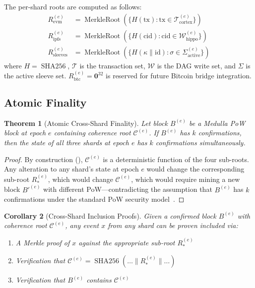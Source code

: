 \documentclass[11pt,twocolumn]{article}
\theoremstyle{definition}
\theoremstyle{plain}
\newtheorem{theorem}{Theorem}[section]
\newtheorem{corollary}[theorem]{Corollary}
\theoremstyle{remark}
\DeclareMathOperator{\merkleroot}{MerkleRoot}
\DeclareMathOperator{\shatwofiftysix}{SHA256}
\begin{document}
The per-shard roots are computed as follows:
\begin{align}
  R_{\mathrm{evm}}^{(e)} &= \merkleroot\!\left(\{H(\mathrm{tx}) : \mathrm{tx} \in \mathcal{T}_{\mathrm{cortex}}^{(e)}\}\right) \label{eq:evm-root}\\
  R_{\mathrm{ipfs}}^{(e)} &= \merkleroot\!\left(\{H(\mathrm{cid}) : \mathrm{cid} \in \mathcal{W}_{\mathrm{hippo}}^{(e)}\}\right) \label{eq:ipfs-root}\\
  R_{\mathrm{sleeves}}^{(e)} &= \merkleroot\!\left(\{H(\kappa \| \mathrm{id}) : \sigma \in \Sigma_{\mathrm{active}}^{(e)}\}\right) \label{eq:sleeve-root}
\end{align}
where $H = \shatwofiftysix$, $\mathcal{T}$ is the transaction set, $\mathcal{W}$ is the DAG write set, and $\Sigma$ is the active sleeve set. $R_{\mathrm{btc}}^{(e)} = \mathbf{0}^{32}$ is reserved for future Bitcoin bridge integration.

\subsection{Atomic Finality}

\begin{theorem}[Atomic Cross-Shard Finality]\label{thm:atomic-finality}
Let block $B^{(e)}$ be a Medulla PoW block at epoch $e$ containing coherence root $\mathcal{C}^{(e)}$. If $B^{(e)}$ has $k$ confirmations, then the state of all three shards at epoch $e$ has $k$ confirmations simultaneously.
\end{theorem}

\begin{proof}
By construction (), $\mathcal{C}^{(e)}$ is a deterministic function of the four sub-roots. Any alteration to any shard's state at epoch $e$ would change the corresponding sub-root $R_*^{(e)}$, which would change $\mathcal{C}^{(e)}$, which would require mining a new block $B'^{(e)}$ with different PoW---contradicting the assumption that $B^{(e)}$ has $k$ confirmations under the standard PoW security model~\cite{nakamoto2008bitcoin,garay2015backbone}.
\end{proof}

\begin{corollary}[Cross-Shard Inclusion Proofs]
Given a confirmed block $B^{(e)}$ with coherence root $\mathcal{C}^{(e)}$, any event $x$ from any shard can be proven included via:
\begin{enumerate}[leftmargin=*,itemsep=1pt]
  \item A Merkle proof of $x$ against the appropriate sub-root $R_*^{(e)}$
  \item Verification that $\mathcal{C}^{(e)} = \shatwofiftysix(\ldots \| R_*^{(e)} \| \ldots)$
  \item Verification that $B^{(e)}$ contains $\mathcal{C}^{(e)}$
\end{enumerate}
\end{corollary}
\end{document}
